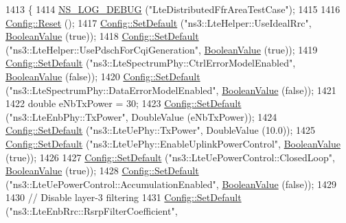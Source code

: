 \begin{DoxyCode}
1413 \{
1414   \hyperlink{group__logging_ga413f1886406d49f59a6a0a89b77b4d0a}{NS\_LOG\_DEBUG} (\textcolor{stringliteral}{"LteDistributedFfrAreaTestCase"});
1415 
1416   \hyperlink{group__config_ga2c1b65724f42f8c72276d7e7ad6df6db}{Config::Reset} ();
1417   \hyperlink{group__config_ga2e7882df849d8ba4aaad31c934c40c06}{Config::SetDefault} (\textcolor{stringliteral}{"ns3::LteHelper::UseIdealRrc"}, 
      \hyperlink{classns3_1_1BooleanValue}{BooleanValue} (\textcolor{keyword}{true}));
1418   \hyperlink{group__config_ga2e7882df849d8ba4aaad31c934c40c06}{Config::SetDefault} (\textcolor{stringliteral}{"ns3::LteHelper::UsePdschForCqiGeneration"}, 
      \hyperlink{classns3_1_1BooleanValue}{BooleanValue} (\textcolor{keyword}{true}));
1419   \hyperlink{group__config_ga2e7882df849d8ba4aaad31c934c40c06}{Config::SetDefault} (\textcolor{stringliteral}{"ns3::LteSpectrumPhy::CtrlErrorModelEnabled"}, 
      \hyperlink{classns3_1_1BooleanValue}{BooleanValue} (\textcolor{keyword}{false}));
1420   \hyperlink{group__config_ga2e7882df849d8ba4aaad31c934c40c06}{Config::SetDefault} (\textcolor{stringliteral}{"ns3::LteSpectrumPhy::DataErrorModelEnabled"}, 
      \hyperlink{classns3_1_1BooleanValue}{BooleanValue} (\textcolor{keyword}{false}));
1421 
1422   \textcolor{keywordtype}{double} eNbTxPower = 30;
1423   \hyperlink{group__config_ga2e7882df849d8ba4aaad31c934c40c06}{Config::SetDefault} (\textcolor{stringliteral}{"ns3::LteEnbPhy::TxPower"}, DoubleValue (eNbTxPower));
1424   \hyperlink{group__config_ga2e7882df849d8ba4aaad31c934c40c06}{Config::SetDefault} (\textcolor{stringliteral}{"ns3::LteUePhy::TxPower"}, DoubleValue (10.0));
1425   \hyperlink{group__config_ga2e7882df849d8ba4aaad31c934c40c06}{Config::SetDefault} (\textcolor{stringliteral}{"ns3::LteUePhy::EnableUplinkPowerControl"}, 
      \hyperlink{classns3_1_1BooleanValue}{BooleanValue} (\textcolor{keyword}{true}));
1426 
1427   \hyperlink{group__config_ga2e7882df849d8ba4aaad31c934c40c06}{Config::SetDefault} (\textcolor{stringliteral}{"ns3::LteUePowerControl::ClosedLoop"}, 
      \hyperlink{classns3_1_1BooleanValue}{BooleanValue} (\textcolor{keyword}{true}));
1428   \hyperlink{group__config_ga2e7882df849d8ba4aaad31c934c40c06}{Config::SetDefault} (\textcolor{stringliteral}{"ns3::LteUePowerControl::AccumulationEnabled"}, 
      \hyperlink{classns3_1_1BooleanValue}{BooleanValue} (\textcolor{keyword}{false}));
1429 
1430   \textcolor{comment}{// Disable layer-3 filtering}
1431   \hyperlink{group__config_ga2e7882df849d8ba4aaad31c934c40c06}{Config::SetDefault} (\textcolor{stringliteral}{"ns3::LteEnbRrc::RsrpFilterCoefficient"},

\end{DoxyCode}

